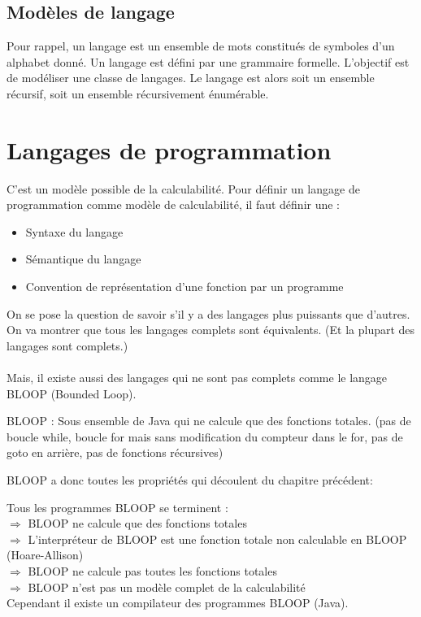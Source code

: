 \subsection{Modèles de langage}
\label{ssub:mod_le_de_langage}
Pour rappel, un langage est un ensemble de mots constitués de symboles d'un alphabet donné.
Un langage est défini par une grammaire formelle. L'objectif est de modéliser
une classe de langages. Le langage est alors soit un ensemble récursif, soit un
ensemble récursivement énumérable.


\section{Langages de programmation}
\label{sub:langages_de_programmation}
C'est un modèle possible de la calculabilité. Pour définir un langage de
programmation comme modèle de calculabilité, il faut définir une :
\begin{itemize}
	\item Syntaxe du langage
	\item Sémantique du langage
	\item Convention de représentation d'une fonction par un programme
\end{itemize}

On se pose la question de savoir s'il y a des langages plus puissants que
d'autres. On va montrer que tous les langages complets sont équivalents. (Et la
plupart des langages sont complets.)

\paragraph{} Mais, il existe aussi des langages qui ne sont pas complets comme le
langage BLOOP (Bounded Loop).

\begin{mydef}
	BLOOP : Sous ensemble de Java qui ne calcule que des fonctions totales.
	(pas de boucle while, boucle for mais sans modification du compteur
	dans le for, pas de goto en arrière, pas de fonctions récursives)
\end{mydef}

BLOOP a donc toutes les propriétés qui découlent du chapitre précédent:

\begin{myprop}
Tous les programmes BLOOP se terminent :\\
    $ \Rightarrow$ BLOOP ne calcule que des fonctions totales\\
    $ \Rightarrow$ L'interpréteur de BLOOP est une fonction totale non calculable en
BLOOP (Hoare-Allison)\\
    $ \Rightarrow$ BLOOP ne calcule pas toutes les fonctions totales\\
    $ \Rightarrow$ BLOOP n'est pas un modèle complet de la calculabilité\\

Cependant il existe un compilateur des programmes BLOOP (Java).\\
\end{myprop}

